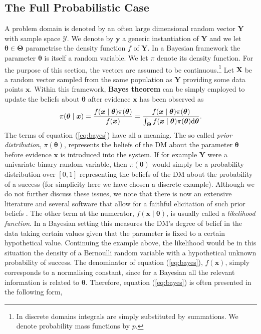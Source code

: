 \subsection{The Full Probabilistic Case}
A problem domain is denoted by an often large dimensional random vector $\bm{Y}$ with sample space $\bm{\mathcal{Y}}$. We denote by $\bm{y}$ a generic instantiation of $\bm{Y}$ and we let $\bm{\theta}\in\bm{\Theta}$ parametrise the density function $f$ of $\bm{Y}$. In a Bayesian framework the parameter $\bm{\theta}$ is itself a random variable. We let $\pi$ denote its density function. For the purpose of this section, the vectors are assumed to be continuous.\footnote{In discrete domains integrals are simply substituted by summations. We denote probability mass functions by $p$.}  Let $\bm{X}$ be a random vector sampled from the same population as $\bm{Y}$ providing some data points $\bm{x}$. Within this framework, \textbf{Bayes theorem} can be  simply  employed to update the beliefs about $\bm{\theta}$ after evidence $\bm{x}$ has been observed as 
\begin{equation}
\label{eq:bayes}
\pi(\bm{\theta}\;|\;\bm{x})=\frac{f(\bm{x}\;|\;\bm{\theta})\pi(\bm{\theta})}{f(\bm{x})}=\frac{f(\bm{x}\;|\;\bm{\theta})\pi(\bm{\theta})}{\int_{\bm{\Theta}}f(\bm{x}\;|\;\bm{\theta})\pi(\bm{\theta})\dr \bm{\theta}}.
\end{equation}
The terms of equation (\ref{eq:bayes}) have all a meaning. The so called \textit{prior distribution}, $\pi(\bm{\theta})$, represents the beliefs of the DM about the parameter $\bm{\theta}$ before evidence $\bm{x}$ is introduced into the system. If for example $\bm{Y}$ were a univariate binary random variable, then $\pi(\bm{\theta})$ would simply be a probability distribution over $[0,1]$ representing the beliefs of the DM about the probability of a success (for simplicity here we have chosen a discrete example). Although we do not further discuss these issues, we note that there is now an extensive literature and several software that allow for a faithful elicitation of such prior beliefs \citep[see e.g.][]{O'Hagan2006a}. The other term at the numerator, $f(\bm{x}\;|\;\bm{\theta})$, is usually called a \textit{likelihood function}. In a Bayesian setting this measures the DM's degree of belief in the data taking certain values given that the parameter is fixed to a certain hypothetical value. Continuing the example above, the likelihood would be in this situation the density of a Bernoulli random variable with a hypothetical unknown probability of success. The denominator of equation (\ref{eq:bayes}), $f(\bm{x})$,  simply corresponds to a normalising constant, since for a Bayesian all the relevant information is related to $\bm{\theta}$. Therefore, equation (\ref{eq:bayes}) is often presented in the following form,
